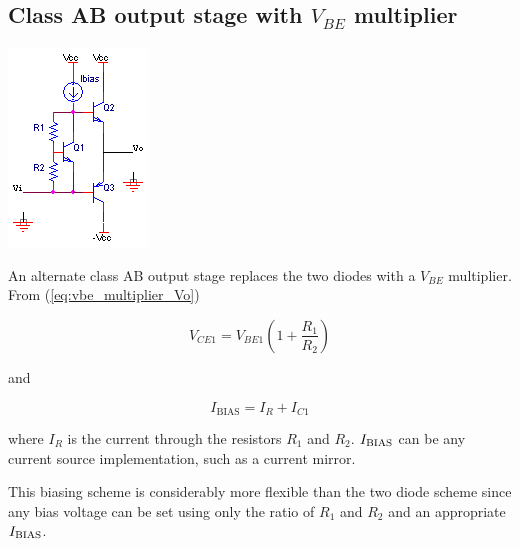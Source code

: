 \subsection{Class AB output stage with $V_{BE}$ multiplier}
\begin{center}
	\includegraphics{schematics/classABvbemultiplier.PNG}
\end{center}
An alternate class AB output stage replaces the two diodes with a $V_{BE}$ multiplier.
From (\ref{eq:vbe_multiplier_Vo})

\begin{equation}
V_{CE1} = V_{BE1}\left(1+\frac{R_{1}}{R_{2}}\right)
\end{equation}

and

\begin{equation}
I_{\text{BIAS}} = I_{R} + I_{C1}
\end{equation}

where $I_{R}$ is the current through the resistors $R_1$ and $R_2$. $I_\mathrm{BIAS}$ can be any current source implementation, such as a current mirror.

This biasing scheme is considerably more flexible than the two diode scheme since any bias voltage can be set using only the ratio of $R_1$ and $R_2$ and an appropriate $I_\mathrm{BIAS}$.

